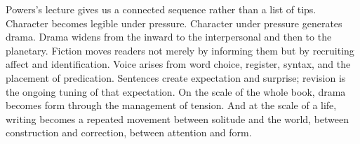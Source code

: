 Powers's lecture gives us a connected sequence rather than a list of tips. Character becomes legible under pressure. Character under pressure generates drama. Drama widens from the inward to the interpersonal and then to the planetary. Fiction moves readers not merely by informing them but by recruiting affect and identification. Voice arises from word choice, register, syntax, and the placement of predication. Sentences create expectation and surprise; revision is the ongoing tuning of that expectation. On the scale of the whole book, drama becomes form through the management of tension. And at the scale of a life, writing becomes a repeated movement between solitude and the world, between construction and correction, between attention and form.